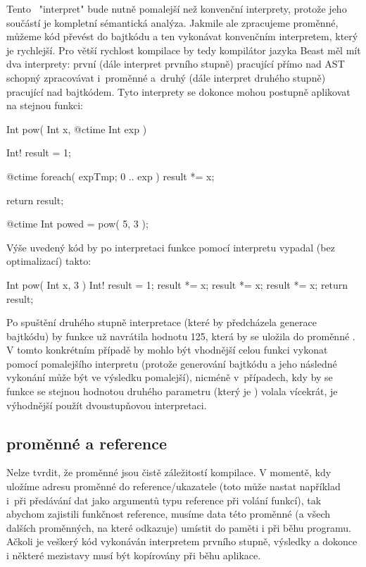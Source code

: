 Tento \ctime~"interpret" bude nutně pomalejší než konvenční interprety, protože jeho součástí je kompletní sémantická analýza. Jakmile ale zpracujeme \ctime proměnné, můžeme kód převést do bajtkódu a ten vykonávat konvenčním interpretem, který je rychlejší. Pro větší rychlost kompilace by tedy kompilátor jazyka Beast měl mít dva interprety: první (dále interpret prvního stupně) pracující přímo nad AST schopný zpracovávat i~\ctime proměnné a~druhý (dále interpret druhého stupně) pracující nad bajtkódem. Tyto interprety se dokonce mohou postupně aplikovat na stejnou funkci:

\begin{code}
Int pow( Int x, @ctime Int exp ) {
	Int! result = 1;
	
	@ctime foreach( expTmp; 0 .. exp )
		result *= x;
		
	return result;
}

@ctime Int powed = pow( 5, 3 );
\end{code}

Výše uvedený kód by po interpretaci funkce  pomocí \ctime interpretu vypadal (bez optimalizací) takto: \nopagebreak

\begin{code}
Int pow( Int x, 3 ) {
	Int! result = 1;
	result *= x;
	result *= x;
	result *= x;
	return result;
}
\end{code}

Po spuštění druhého stupně interpretace (které by předcházela generace bajtkódu) by funkce už navrátila hodnotu 125, která by se uložila do proměnné . V tomto konkrétním případě by mohlo být vhodnější celou funkci vykonat pomocí pomalejšího \ctime interpretu (protože generování bajtkódu a jeho následné vykonání může být ve výsledku pomalejší), nicméně v~případech, kdy by se funkce  se stejnou hodnotou druhého parametru (který je \ctime) volala vícekrát, je výhodnější použít dvoustupňovou interpretaci.


\subsection{\ctime proměnné a \nonctime reference} \label{ctime:impl:ref}
Nelze tvrdit, že \ctime proměnné jsou čistě záležitostí kompilace. V momentě, kdy uložíme adresu \ctime proměnné do \nonctime reference/ukazatele (toto může nastat například i~při předávání \ctime dat jako argumentů typu reference při volání \nonctime funkcí), tak abychom zajistili funkčnost reference, musíme data této proměnné (a všech dalších proměnných, na které odkazuje) umístit do paměti i při běhu programu. Ačkoli je veškerý \ctime kód vykonáván interpretem prvního stupně, výsledky a dokonce i některé mezistavy musí být kopírovány při běhu aplikace.

